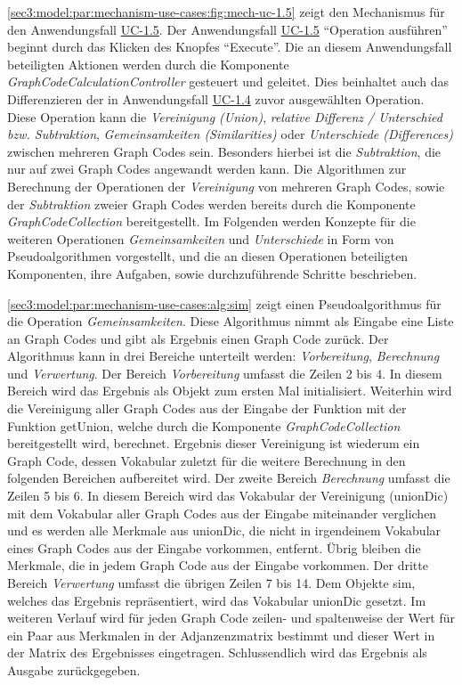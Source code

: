 \cref{sec3:model:par:mechanism-use-cases:fig:mech-uc-1.5} zeigt den Mechanismus für den Anwendungsfall \hyperref[sec3:model:uc-1.5]{UC-1.5}.
Der Anwendungsfall \hyperref[sec3:model:uc-1.5]{UC-1.5} \enquote{Operation ausführen} beginnt durch das Klicken des Knopfes \enquote{Execute}.
Die an diesem Anwendungsfall beteiligten Aktionen werden durch die Komponente \textit{GraphCodeCalculationController} gesteuert und geleitet.
Dies beinhaltet auch das Differenzieren der in Anwendungsfall \hyperref[sec3:model:uc-1.4]{UC-1.4} zuvor ausgewählten Operation.
Diese Operation kann die \textit{Vereinigung (Union)}, \textit{relative Differenz / Unterschied bzw. Subtraktion}, \textit{Gemeinsamkeiten (Similarities)} oder \textit{Unterschiede (Differences) }zwischen mehreren Graph Codes sein.
Besonders hierbei ist die \textit{Subtraktion}, die nur auf zwei Graph Codes angewandt werden kann.
Die Algorithmen zur Berechnung der Operationen der \textit{Vereinigung} von mehreren Graph Codes, sowie der \textit{Subtraktion} zweier Graph Codes werden bereits durch die Komponente \textit{GraphCodeCollection} bereitgestellt.
Im Folgenden werden Konzepte für die weiteren Operationen \textit{Gemeinsamkeiten} und \textit{Unterschiede} in Form von Pseudoalgorithmen vorgestellt, und die an diesen Operationen beteiligten Komponenten, ihre Aufgaben, sowie durchzuführende Schritte beschrieben.



\cref{sec3:model:par:mechanism-use-cases:alg:sim} zeigt einen Pseudoalgorithmus für die Operation \textit{Gemeinsamkeiten}.
Diese Algorithmus nimmt als Eingabe eine Liste an Graph Codes und gibt als Ergebnis einen Graph Code zurück.
Der Algorithmus kann in drei Bereiche unterteilt werden: \textit{Vorbereitung}, \textit{Berechnung} und \textit{Verwertung}.
Der Bereich \textit{Vorbereitung} umfasst die Zeilen 2 bis 4.
In diesem Bereich wird das Ergebnis als Objekt zum ersten Mal initialisiert.
Weiterhin wird die Vereinigung aller Graph Codes aus der Eingabe der Funktion mit der Funktion getUnion, welche durch die Komponente \textit{GraphCodeCollection} bereitgestellt wird, berechnet.
Ergebnis dieser Vereinigung ist wiederum ein Graph Code, dessen Vokabular zuletzt für die weitere Berechnung in den folgenden Bereichen aufbereitet wird.
Der zweite Bereich \textit{Berechnung} umfasst die Zeilen 5 bis 6.
In diesem Bereich wird das Vokabular der Vereinigung (unionDic) mit dem Vokabular aller Graph Codes aus der Eingabe miteinander verglichen und es werden alle Merkmale aus unionDic, die nicht in irgendeinem Vokabular eines Graph Codes aus der Eingabe vorkommen, entfernt.
Übrig bleiben die Merkmale, die in jedem Graph Code aus der Eingabe vorkommen.
Der dritte Bereich \textit{Verwertung} umfasst die übrigen Zeilen 7 bis 14.
Dem Objekte sim, welches das Ergebnis repräsentiert, wird das Vokabular unionDic gesetzt.
Im weiteren Verlauf wird für jeden Graph Code zeilen- und spaltenweise der Wert für ein Paar aus Merkmalen in der Adjanzenzmatrix bestimmt und dieser Wert in der Matrix des Ergebnisses eingetragen.
Schlussendlich wird das Ergebnis als Ausgabe zurückgegeben.

